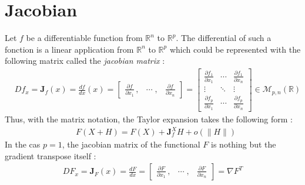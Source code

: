 \section{Jacobian}
Let $f$ be a differentiable function from $\mathbb{R}^n$ to $\mathbb{R}^p$. The differential of such a fonction is a linear application from $\mathbb{R}^n$ to $\mathbb{R}^p$ which could be represented with the following matrix called the \emph{jacobian matrix} :
\begin{align}
	&Df_{x} = \boldsymbol{J}_f(x) = \frac{df}{dx}(x) = 
	\left[\begin{array}{ccc}
		\frac{\partial f}{\partial x_1} \,,& \cdots \;, & \frac{\partial f}{\partial x_n}
	\end{array}\right] =
	\left[\begin{array}{ccc}
		\frac{\partial f_1}{\partial x_1} & \cdots & \frac{\partial f_1}{\partial x_n} \\
		\vdots & \ddots & \vdots \\
		\frac{\partial f_p}{\partial x_1} & \cdots & \frac{\partial f_p}{\partial x_n}
	\end{array}\right]\in\mathcal{M}_{p,n}(\mathbb{R})
\end{align}
Thus, with the matrix notation, the Taylor expansion takes the following form :
\begin{align}
	&F(X+H) = F(X) +  \boldsymbol{J}_f^XH + o(\|H\|)
\end{align}
In the cas $p=1$, the jacobian matrix of the functional $F$ is nothing but the gradient transpose itself :
\begin{align}
	DF_{x} = \boldsymbol{J}_F(x) = \frac{dF}{dx} = 
	\left[\begin{array}{ccc}
		\frac{\partial F}{\partial x_1} \,,& \cdots \;, &\frac{\partial F}{\partial x_n}
	\end{array}\right] = \nabla F^T
\end{align}

